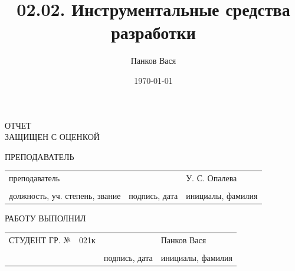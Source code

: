 \documentclass[14pt]{extarticle}
\author{Панков Вася}
\date{\today}
\title{02.02. Инструментальные средства разработки}
\begin{document}
\begin{titlepage}


\vspace{32pt}


\vspace{60pt}

\raggedright{ОТЧЕТ \\
ЗАЩИЩЕН С ОЦЕНКОЙ}
\vspace{14pt}

\raggedright{ПРЕПОДАВАТЕЛЬ}

\vspace{12pt}

\begin{tabularx}{\textwidth}{ >{\centering\arraybackslash}X >{\centering\arraybackslash}X >{\centering\arraybackslash}X }
	 преподаватель & & У. С. Опалева \\ 
	 \hrulefill & \hrulefill & \hrulefill \\ 
\footnotesize{должность, уч. степень, звание} & \footnotesize{подпись, дата} & \footnotesize{инициалы, фамилия} \\ 
\end{tabularx} 
 
\vspace{48pt} 


\vspace{76pt} 


\vspace*{\fill} 

\raggedright{РАБОТУ ВЫПОЛНИЛ} 

\vspace{10pt} 

\begin{tabularx}{\textwidth}{>{\raggedright\arraybackslash}X  >{\centering\arraybackslash}X >{\centering\arraybackslash}X >{\centering\arraybackslash}X }
	 СТУДЕНТ ГР. № & 021к & & Панков Вася \\ 
	 & \hrulefill & \hrulefill & \hrulefill \\ 
	 &  & \footnotesize{подпись, дата} & \footnotesize{инициалы, фамилия} \\ 
\end{tabularx} 
 
\vspace*{\fill} 


\end{titlepage}
\end{document}
